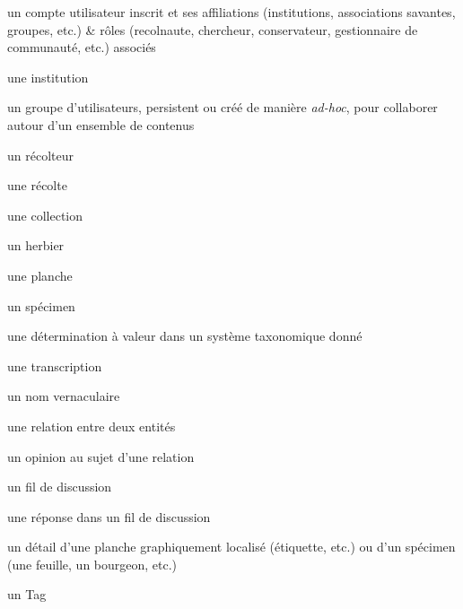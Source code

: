 \startchapter[title={Les types d'entités ReColNat(+)},reference=c:entites]

\startsection[title={Identification des entités d'intérêt}]

\startsubsection[title={Entités sociales}]

\startitemize
	\item un compte utilisateur inscrit et ses affiliations (institutions, associations savantes, groupes, etc.) & rôles (recolnaute, chercheur, conservateur, gestionnaire de communauté, etc.) associés
	\item une institution
	\item un groupe d'utilisateurs, persistent ou créé de manière {\it ad-hoc}, pour collaborer autour d'un ensemble de contenus
\stopitemize

\startsubsection[title={Entités scientifiques},reference=c:entites:scientifiques]

\startitemize
	\item un récolteur
	\item une récolte
	\item une collection
	\item un herbier
	\item une planche
	\item un spécimen
	\item une détermination à valeur dans un système taxonomique donné
	\item une transcription
	\item un nom vernaculaire
\stopitemize

\startsubsection[title={Entités contributives}]

\startitemize
	\item une relation entre deux entités
	\item un opinion au sujet d'une relation
	\item un fil de discussion
	\item une réponse dans un fil de discussion
	\item un détail d'une planche graphiquement localisé (étiquette, etc.) ou d'un spécimen (une feuille, un bourgeon, etc.)
	\item un Tag
\stopitemize

